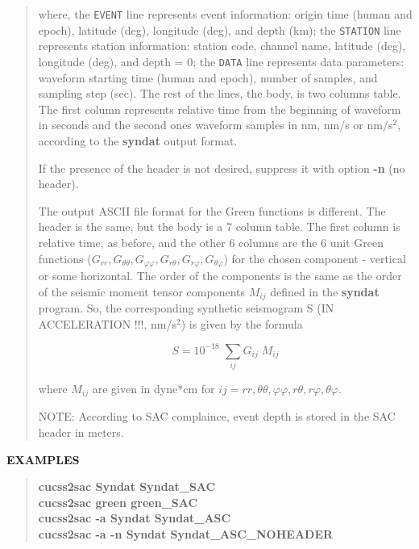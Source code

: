 \begin{quote}
where,
the \texttt{EVENT} line represents event information: origin time 
(human and epoch), latitude (deg), longitude (deg), and depth (km); 
the \texttt{STATION} line represents station information: station code,
channel name, latitude (deg), longitude (deg), and depth = 0; the 
\texttt{DATA} line represents data parameters: waveform 
starting time (human and epoch), number of samples, and sampling step 
(sec). The rest of the lines, the body, is two columns table. The first 
column represents relative time from the beginning of waveform in 
seconds and the second ones waveform samples in nm, nm/s or nm/s$^2$, 
according to the {\bf syndat} output format.

If the presence of the header is not desired, suppress it with option 
{\bf -n} (no header).

The output ASCII file format for the Green functions is different. 
The header is the same, but the body is a 7 column table. The first 
column is relative time, as before, and the other 6 columns are the 6 
unit Green functions ($G_{rr}, G_{\theta\theta}, G_{\varphi\varphi}, 
G_{r\theta}, G_{r\varphi}, G_{\theta\varphi}$) for the chosen 
component - vertical or some horizontal. The order of the components 
is the same as the order of the seismic moment tensor components 
$M_{ij}$ defined in the {\bf syndat} program. So, the corresponding 
synthetic seismogram S (IN ACCELERATION !!!, nm/s$^2$) is given by 
the formula

            \[ S = 10^{-18}\;\sum_{ij} G_{ij}\;M_{ij} \]

where $M_{ij}$ are given in dyne*cm for $ij = rr, \theta\theta,
\varphi\varphi, r\theta, r\varphi, \theta\varphi$.

NOTE: According to SAC complaince, event depth is stored in the SAC 
header in meters.
\end{quote}
\vred
{\bf EXAMPLES}
\vred
\begin{quote}
\vred
\textbf{cucss2sac Syndat Syndat\_SAC  \\
    cucss2sac green  green\_SAC \\
    cucss2sac -a Syndat Syndat\_ASC \\
    cucss2sac -a -n Syndat Syndat\_ASC\_NOHEADER} 
\vred
\end{quote}
\newpage
